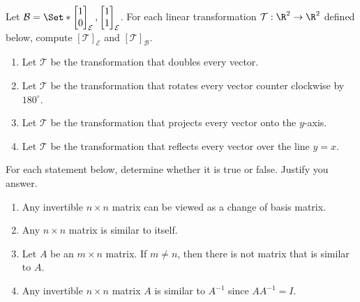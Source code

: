 \begin{exercises}
\begin{problist}
		\prob Let $\mathcal B=\Set*{\mat{1\\0}_{\mathcal E},\mat{1\\1}_{\mathcal E}}$.
		For each linear transformation
		$\mathcal T:\R^{2}\to\R^{2}$ defined below, compute
		$[\mathcal T]_{\mathcal E}$ and $[\mathcal T]_{\mathcal B}$.
		\begin{enumerate}
			\item Let $\mathcal T$ be the transformation that doubles
				every vector.

			\item Let $\mathcal T$ be the transformation that rotates
				every vector counter clockwise by $180^{\circ}$.

			\item Let $\mathcal T$ be the transformation that projects
				every vector onto the $y$-axis.

			\item Let $\mathcal T$ be the transformation that reflects
				every vector over the line $y=x$.
		\end{enumerate}

		\prob For each statement below, determine whether it is true or false. Justify you answer.
		\begin{enumerate}
			\item Any invertible $n \times n$ matrix can be viewed as
				a change of basis matrix.

			\item Any $n \times n$ matrix is similar to itself.

			\item Let $A$ be an $m \times n$ matrix. If $m
				\neq n$, then there is not matrix that is
				similar to $A$.

			\item Any invertible $n \times n$ matrix $A$ is similar to
				$A^{-1}$ since $AA^{-1}=I$.
		\end{enumerate}
	\end{problist}
\end{exercises}
